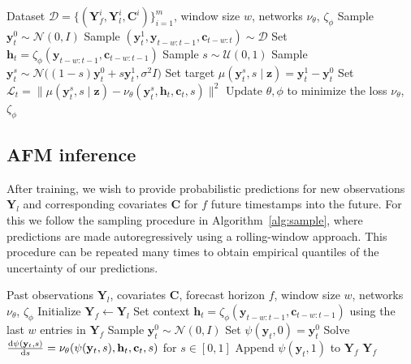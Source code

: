 \documentclass[a4paper,10pt,twocolumn,preprint,3p]{elsarticle}
\begin{document}
\begin{algorithm}[ht]
\caption{AFM training.}\label{alg:train}
\begin{small}
\begin{algorithmic}[1]
\Require Dataset $\mathcal{D}=\{(\mathbf{Y}_f^i,\mathbf{Y}_l^i,\mathbf{C}^i)\}_{i=1}^{m}$, window size $w$, networks $\nu_\theta$, $\zeta_\phi$
        \State Sample $\mathbf{y}_t^0\sim\mathcal{N}(0,I)$
        \State Sample $(\mathbf{y}_t^1,\mathbf{y}_{t-w:t-1},\mathbf{c}_{t-w:t}) \sim \mathcal{D}$
        \State Set $\mathbf{h}_t=\zeta_\phi(\mathbf{y}_{t-w:t-1},\mathbf{c}_{t-w:t-1})$
        \State Sample $s\sim\mathcal{U}(0,1)$
        \State Sample $\mathbf{y}_t^s\sim\mathcal{N}\big((1-s)\mathbf{y}_t^0+s\mathbf{y}_t^1,\sigma^2 I\big)$
        \State Set target $\mu(\mathbf{y}_t^s,s\mid\mathbf{z})=\mathbf{y}_t^1-\mathbf{y}_t^0$
        \State Set  $\mathcal{L}_t=\|\mu(\mathbf{y}_t^s,s\mid\mathbf{z})-\nu_\theta(\mathbf{y}_t^s,\mathbf{h}_t,\mathbf{c}_t,s)\|^2$
        \State Update $\theta,\phi$ to minimize the loss
\EndWhile
\State \Return $\nu_\theta$, $\zeta_\phi$
\end{algorithmic}
\end{small}
\end{algorithm}



\subsection{AFM inference}
After training, we wish to provide probabilistic predictions for new  observations $\mathbf{Y}_l$ and corresponding covariates $\mathbf{C}$ for $f$ future timestamps into the future. 
For this we follow the sampling procedure in Algorithm~\ref{alg:sample}, where predictions are made autoregressively using a rolling-window approach. This procedure can be repeated many times to obtain empirical quantiles of the uncertainty of our predictions.


\begin{algorithm}
\caption{AFM inference.}\label{alg:sample}
\begin{small}
\begin{algorithmic}[1]
\Require Past observations $\mathbf{Y}_l$, covariates $\mathbf{C}$, forecast horizon $f$, window size $w$, networks $\nu_\theta$, $\zeta_\phi$
\State Initialize $\mathbf{Y}_{f} \gets \mathbf{Y}_l$
    \State Set context $\mathbf{h}_t = \zeta_\phi(\mathbf{y}_{t-w:t-1}, \mathbf{c}_{t-w:t-1})$ using the last $w$ entries in $\mathbf{Y}_{f}$
    \State Sample $\mathbf{y}_t^0 \sim \mathcal{N}(0,I)$
    \State Set $\psi(\mathbf{y}_t,0)=\mathbf{y}_t^0$
    \State Solve $
    \dv{\psi(\mathbf{y}_t,s)}{s}=\nu_\theta(\psi(\mathbf{y}_t,s),\mathbf{h}_t,\mathbf{c}_t,s)$ for $s\in[0,1]$
    \State Append $\psi(\mathbf{y}_t,1)$ to $\mathbf{Y}_{f}$
\EndFor
\State \Return $\mathbf{Y}_{f}$
\end{algorithmic}
\end{small}
\end{algorithm}
\end{document}
